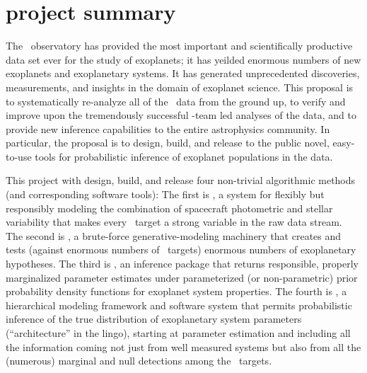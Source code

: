 \documentclass[letterpaper,12pt]{article}
\newcommand{\Untrendy}{\project{Untrendy}}
\newcommand{\turnstyle}{\project{turnstyle}}
\newcommand{\bart}{\project{Bart}}
\newcommand{\TheCreator}{\project{The~Creator}}
\begin{document}
\section*{project summary}

The \Kepler\ observatory has provided the most important and
scientifically productive data set ever for the study of exoplanets;
it has yeilded enormous numbers of new exoplanets and exoplanetary
systems.  It has generated unprecedented discoveries, measurements,
and insights in the domain of exoplanet science.  This proposal is to
systematically re-analyze all of the \Kepler\ data from the ground up,
to verify and improve upon the tremendously successful \Kepler-team
led analyses of the data, and to provide new inference capabilities to
the entire astrophysics community.  In particular, the proposal is to
design, build, and release to the public novel, easy-to-use tools for
probabilistic inference of exoplanet populations in the \Kepler data.

This project with design, build, and release four non-trivial
algorithmic methods (and corresponding software tools): The first is
\Untrendy, a system for flexibly but responsibly modeling the
combination of spacecraft photometric and stellar variability that
makes every \Kepler\ target a strong variable in the raw data stream.
The second is \turnstyle, a brute-force generative-modeling machinery
that creates and tests (against enormous numbers of \Kepler\ targets)
enormous numbers of exoplanetary hypotheses.  The third is \bart, an
inference package that returns responsible, properly marginalized
parameter estimates under parameterized (or non-parametric) prior
probability density functions for exoplanet system properties.  The
fourth is \TheCreator, a hierarchical modeling framework and software
system that permits probabilistic inference of the true distribution
of exoplanetary system parameters (``architecture'' in the lingo),
starting at parameter estimation and including all the information
coming not just from well measured systems but also from all the
(numerous) marginal and null detections among the \Kepler\ targets.
\end{document}
